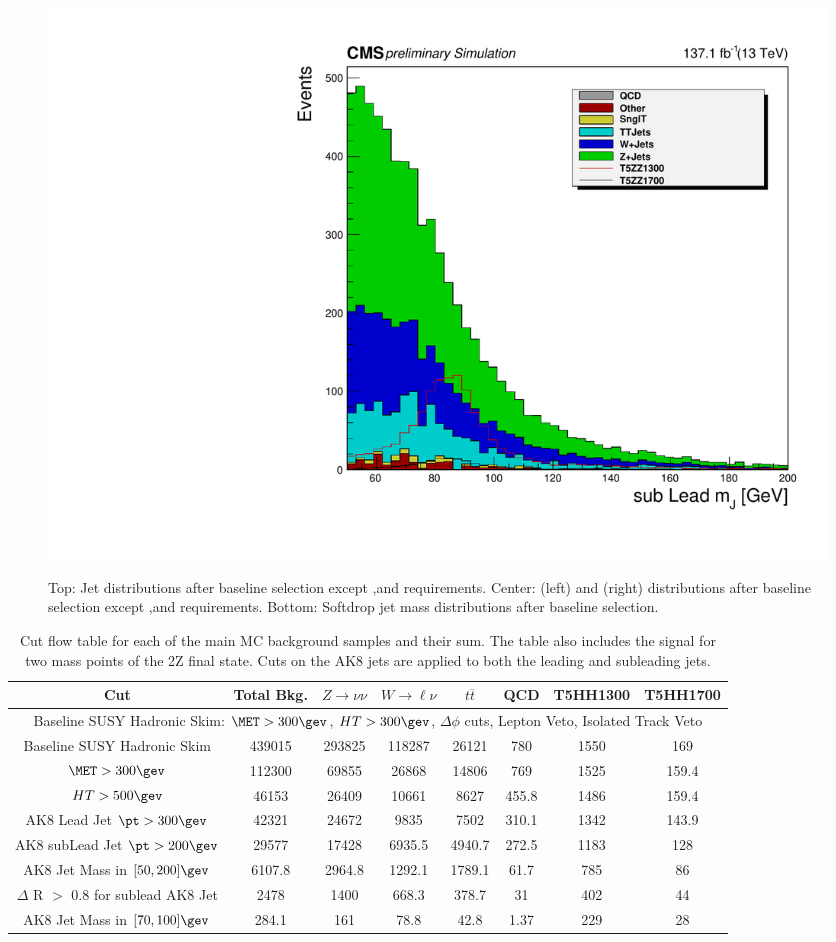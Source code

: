 \begin{figure}[htbp!]
  \includegraphics[width=0.48\linewidth]{plots/event-selection/PrunedMass2scaled137allselection.pdf}\\[1mm]
  \caption{
     Top: Jet \pt distributions after baseline selection except \HT,\MET and \pt requirements.
     Center:  \HT(left) and \MET(right) distributions after  baseline selection except \HT,\MET and \pt requirements.
     Bottom: Softdrop jet mass distributions after  baseline selection.
  }
  \label{fig:cutFlow2}
\end{figure}


\newpage
\begin{landscape}
 \begin{table}[htb!]
  \caption{
   Cut flow table for each of the main MC background samples and their sum. The table also includes the signal for two mass points of the 2Z final state. Cuts on the AK8 jets are applied to both the leading and subleading jets.
  }
  \begin{tabular}{|c|c|c|c|c|c|c|c|}
   \hline
	\hline
   Cut & Total Bkg. & $Z\rightarrow\nu\nu$ & $W\rightarrow\ell\nu$ & $t\overline{t}$ & QCD & T5HH1300 & T5HH1700  \\
	\hline
	\hline
	\multicolumn{8}{c}{Baseline SUSY Hadronic Skim: $\met>300\gev$, $HT>300\gev$, $\Delta\phi$ cuts, Lepton Veto, Isolated Track Veto}\\
   \hline
	Baseline SUSY Hadronic Skim &  439015 & 293825 & 118287 & 26121 & 780 & 1550  & 169 \\ \hline
	$\met>300\gev$ & 112300 & 69855 & 26868 & 14806 & 769 & 1525 & 159.4 \\ \hline
	$HT>500\gev$ & 46153 & 26409 & 10661 & 8627 & 455.8 &  1486 & 159.4 \\ \hline
	AK8 Lead Jet $\pt>300\gev$ &  42321  & 24672 & 9835 & 7502 & 310.1 & 1342  & 143.9 \\ \hline
	AK8 subLead Jet $\pt>200\gev$ & 29577  & 17428 & 6935.5  & 4940.7 &  272.5& 1183  & 128 \\ \hline
	AK8 Jet Mass in $[50,200]\gev$ & 6107.8 & 2964.8 & 1292.1 & 1789.1 &61.7 &   785 &  86   \\ \hline
	$\Delta$ R $>$ 0.8 for sublead AK8 Jet &2478 & 1400 & 668.3 & 378.7 &31 & 402 & 44  \\ \hline
	AK8 Jet Mass in $[70,100]\gev$ &  284.1 & 161 & 78.8 & 42.8 & 1.37 & 229 & 28\\ \hline
   \hline
   \hline
   \end{tabular}
   \label{tab:Cutflow}
  \end{table}
\end{landscape}

